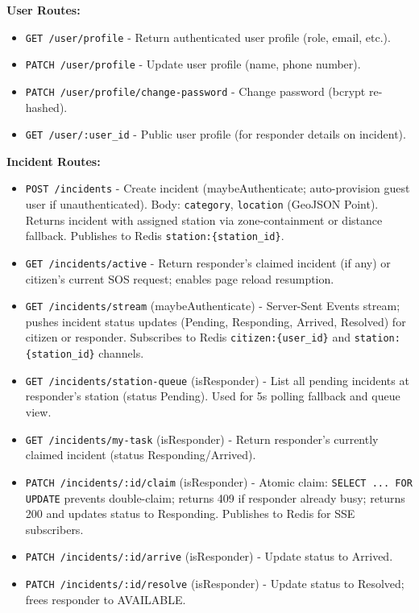\textbf{User Routes:}
\begin{itemize}
  \item \texttt{GET /user/profile} - Return authenticated user profile (role, email, etc.).
  \item \texttt{PATCH /user/profile} - Update user profile (name, phone number).
  \item \texttt{PATCH /user/profile/change-password} - Change password (bcrypt re-hashed).
  \item \texttt{GET /user/:user\_id} - Public user profile (for responder details on incident).
\end{itemize}

\textbf{Incident Routes:}
\begin{itemize}
  \item \texttt{POST /incidents} - Create incident (maybeAuthenticate; auto-provision guest user if unauthenticated). Body: \texttt{category}, \texttt{location} (GeoJSON Point). Returns incident with assigned station via zone-containment or distance fallback. Publishes to Redis \texttt{station:\{station\_id\}}.
  \item \texttt{GET /incidents/active} - Return responder's claimed incident (if any) or citizen's current SOS request; enables page reload resumption.
  \item \texttt{GET /incidents/stream} (maybeAuthenticate) - Server-Sent Events stream; pushes incident status updates (Pending, Responding, Arrived, Resolved) for citizen or responder. Subscribes to Redis \texttt{citizen:\{user\_id\}} and \texttt{station:\{station\_id\}} channels.
  \item \texttt{GET /incidents/station-queue} (isResponder) - List all pending incidents at responder's station (status Pending). Used for 5s polling fallback and queue view.
  \item \texttt{GET /incidents/my-task} (isResponder) - Return responder's currently claimed incident (status Responding/Arrived).
  \item \texttt{PATCH /incidents/:id/claim} (isResponder) - Atomic claim: \texttt{SELECT ... FOR UPDATE} prevents double-claim; returns 409 if responder already busy; returns 200 and updates status to Responding. Publishes to Redis for SSE subscribers.
  \item \texttt{PATCH /incidents/:id/arrive} (isResponder) - Update status to Arrived.
  \item \texttt{PATCH /incidents/:id/resolve} (isResponder) - Update status to Resolved; frees responder to AVAILABLE.
\end{itemize}


